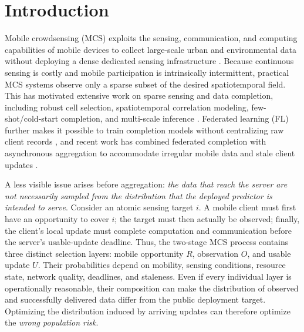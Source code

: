 \documentclass[letterpaper,journal]{IEEEtran}
\begin{document}
\section{Introduction}
\label{sec:introduction}

Mobile crowdsensing (MCS) exploits the sensing, communication, and computing
capabilities of mobile devices to collect large-scale urban and environmental
data without deploying a dense dedicated sensing infrastructure
\cite{ganti2011mobile,guo2015mobile,ma2014opportunities}.  Because
continuous sensing is costly and mobile participation is intrinsically
intermittent, practical MCS systems observe only a sparse subset of the desired
spatiotemporal field.  This has motivated extensive work on sparse sensing and
data completion, including robust cell selection, spatiotemporal correlation
modeling, few-shot/cold-start completion, and multi-scale inference
\cite{wang2023outlier,li2024robust,wang2023transformer,wang2024fewshot,wang2025evolutionary,xu2025rethinking,liu2026pyramid,zhang2026mapt,tian2026reshaping}.
Federated learning (FL) further makes it possible to train completion models
without centralizing raw client records
\cite{mcmahan2017communication,yang2019federated,kairouz2021advances,li2020federated},
and recent work has combined federated completion with asynchronous aggregation
to accommodate irregular mobile data and stale client updates
\cite{wang2026federated,xie2019asynchronous,liu2023adaptive,sun2024staleness,qiao2025asmafl,chen2026dvafl}.

A less visible issue arises before aggregation: \emph{the data that reach the
server are not necessarily sampled from the distribution that the deployed
predictor is intended to serve}.  Consider an atomic sensing target $i$.  A
mobile client must first have an opportunity to cover $i$; the target must then
actually be observed; finally, the client's local update must complete
computation and communication before the server's usable-update deadline.
Thus, the two-stage MCS process contains three distinct selection layers:
mobile opportunity $R$, observation $O$, and usable update $U$.  Their
probabilities depend on mobility, sensing conditions, resource state, network
quality, deadlines, and staleness.  Even if every individual layer is
operationally reasonable, their composition can make the distribution of
observed and successfully delivered data differ from the public deployment
target.  Optimizing the distribution induced by arriving updates can therefore
optimize the \emph{wrong population risk}.
\end{document}
